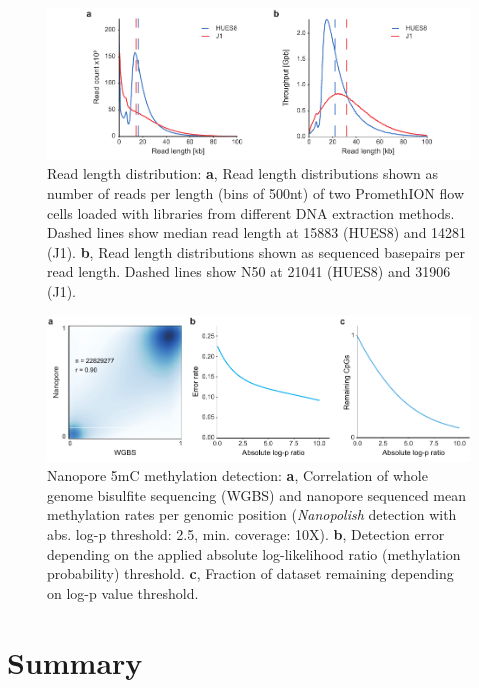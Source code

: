 \begin{figure}[h]
    \centering
    \includegraphics[width=1.0\textwidth]{figures/state_of_art/read_length.pdf}
    \captionsetup{format=plain}
    \caption[Read length median and N50]{Read length distribution: \textbf{a}, Read length distributions shown as number of reads per length (bins of 500nt) of two PromethION flow cells loaded with libraries from different DNA extraction methods. Dashed lines show median read length at 15883 (HUES8) and 14281 (J1). \textbf{b}, Read length distributions shown as sequenced basepairs per read length. Dashed lines show N50 at 21041 (HUES8) and 31906 (J1).}
    \label{fig:state_of_art:read_length}
\end{figure}

\begin{figure}[h]
    \centering
    \includegraphics[width=1.0\textwidth]{figures/state_of_art/methylation.pdf}
    \captionsetup{format=plain}
    \caption[Nanopore methylation detection]{Nanopore 5mC methylation detection: \textbf{a}, Correlation of whole genome bisulfite sequencing (WGBS) and nanopore sequenced mean methylation rates per genomic position (\textit{Nanopolish} detection with abs. log-p threshold: 2.5, min. coverage: 10X). \textbf{b}, Detection error depending on the applied absolute log-likelihood ratio (methylation probability) threshold. \textbf{c}, Fraction of dataset remaining depending on log-p value threshold.}
    \label{fig:state_of_art:methylation}
\end{figure}




\section{Summary}
\label{sec:stat_of_art:summary}








